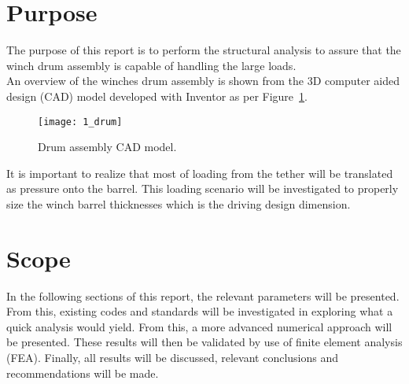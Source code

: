 \section{Purpose}

The purpose of this report is to perform the structural analysis to assure that the winch drum assembly is capable of handling the large loads.\\

An overview of the winches drum assembly is shown from the 3D computer aided design (CAD) model developed with Inventor \cite{INVENTOR} as per Figure~\ref{fig:1_drum}.
\begin{figure}[H]
	\centering
	\texttt{[image: 1\_drum]}
	\caption{Drum assembly CAD model.}
	\label{fig:1_drum}
\end{figure}

It is important to realize that most of loading from the tether will be translated as pressure onto the barrel. This loading scenario will be investigated to properly size the winch barrel thicknesses which is the driving design dimension.

\section{Scope}

In the following sections of this report, the relevant parameters will be presented. From this, existing codes and standards will be investigated in exploring what a quick analysis would yield. From this, a more advanced numerical approach will be presented. These results will then be validated by use of finite element analysis (FEA). Finally, all results will be discussed, relevant conclusions and recommendations will be made.